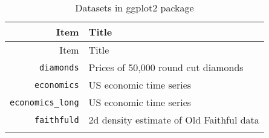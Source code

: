 \documentclass[]{book}
\begin{document}
\begin{enumerate}
  \begin{longtable}[]{@{}rl@{}}
  \caption{\label{tab:ggplot2-data} Datasets in ggplot2
  package}\tabularnewline
  \toprule
  \begin{minipage}[b]{0.22\columnwidth}\raggedleft\strut
  Item\strut
  \end{minipage} &
  \begin{minipage}[b]{0.61\columnwidth}\raggedright\strut
  Title\strut
  \end{minipage}\tabularnewline
  \midrule
  \endfirsthead
  \toprule
  \begin{minipage}[b]{0.22\columnwidth}\raggedleft\strut
  Item\strut
  \end{minipage} &
  \begin{minipage}[b]{0.61\columnwidth}\raggedright\strut
  Title\strut
  \end{minipage}\tabularnewline
  \midrule
  \endhead
  \begin{minipage}[t]{0.22\columnwidth}\raggedleft\strut
  \texttt{diamonds}\strut
  \end{minipage} &
  \begin{minipage}[t]{0.61\columnwidth}\raggedright\strut
  Prices of 50,000 round cut diamonds\strut
  \end{minipage}\tabularnewline
  \begin{minipage}[t]{0.22\columnwidth}\raggedleft\strut
  \texttt{economics}\strut
  \end{minipage} &
  \begin{minipage}[t]{0.61\columnwidth}\raggedright\strut
  US economic time series\strut
  \end{minipage}\tabularnewline
  \begin{minipage}[t]{0.22\columnwidth}\raggedleft\strut
  \texttt{economics\_long}\strut
  \end{minipage} &
  \begin{minipage}[t]{0.61\columnwidth}\raggedright\strut
  US economic time series\strut
  \end{minipage}\tabularnewline
  \begin{minipage}[t]{0.22\columnwidth}\raggedleft\strut
  \texttt{faithfuld}\strut
  \end{minipage} &
  \begin{minipage}[t]{0.61\columnwidth}\raggedright\strut
  2d density estimate of Old Faithful data\strut
  \end{minipage}\tabularnewline
  \begin{minipage}[t]{0.22\columnwidth}\raggedleft\strut

\end{minipage}
\end{longtable}
\end{enumerate}
\end{document}
